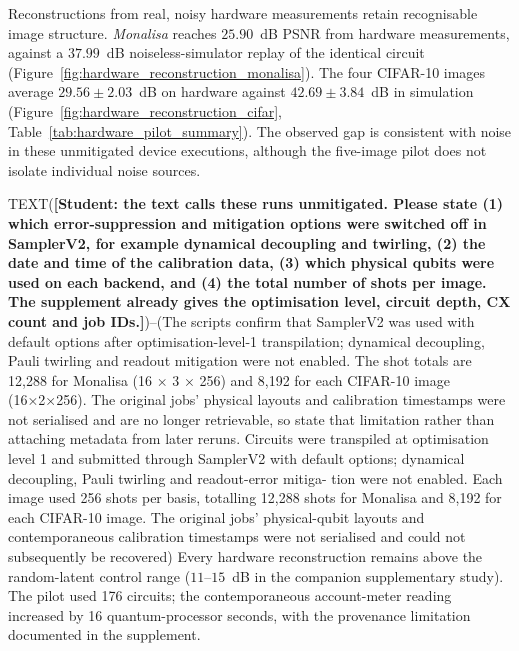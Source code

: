 \documentclass[pdflatex,sn-basic]{sn-jnl}
\begin{document}
Reconstructions from real, noisy hardware measurements retain recognisable image
structure. \textit{Monalisa} reaches $25.90$~dB PSNR from hardware measurements,
against a $37.99$~dB noiseless-simulator replay of the identical circuit
(Figure~\ref{fig:hardware_reconstruction_monalisa}). The four CIFAR-10 images
average $29.56\pm2.03$~dB on hardware against $42.69\pm3.84$~dB in simulation
(Figure~\ref{fig:hardware_reconstruction_cifar},
Table~\ref{tab:hardware_pilot_summary}). The observed gap is consistent with
noise in these unmitigated device executions, although the five-image pilot does
not isolate individual noise sources.

TEXT({\color{red}\textbf{[Student: the text calls these runs unmitigated. Please
state (1) which error-suppression and mitigation options were switched off in
SamplerV2, for example dynamical decoupling and twirling, (2) the date and time
of the calibration data, (3) which physical qubits were used on each backend,
and (4) the total number of shots per image. The supplement already gives the
optimisation level, circuit depth, CX count and job IDs.]}})--(The scripts confirm that SamplerV2 was used with default options after
optimisation-level-1 transpilation; dynamical decoupling, Pauli twirling and readout
mitigation were not enabled. The shot totals are 12,288 for Monalisa (16 × 3 × 256)
and 8,192 for each CIFAR-10 image (16×2×256). The original jobs’ physical layouts
and calibration timestamps were not serialised and are no longer retrievable, so state
that limitation rather than attaching metadata from later reruns. 
Circuits were transpiled at optimisation level 1 and submitted through SamplerV2
with default options; dynamical decoupling, Pauli twirling and readout-error mitiga-
tion were not enabled. Each image used 256 shots per basis, totalling 12,288 shots
for Monalisa and 8,192 for each CIFAR-10 image. The original jobs’ physical-qubit
layouts and contemporaneous calibration timestamps were not serialised and could
not subsequently be recovered) Every hardware reconstruction remains above
the random-latent control range ($11$--$15$~dB in the companion supplementary
study). The pilot used 176 circuits; the contemporaneous account-meter reading
increased by 16 quantum-processor seconds, with the provenance limitation
documented in the supplement.
\end{document}
